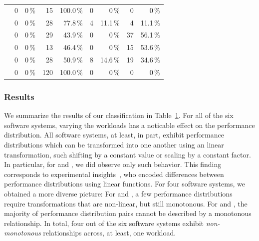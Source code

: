 {\begin{table}
\begin{tabular}{lrrrrrrrr}
	\jumper & 
	0 & 0\,\% & 
	\cellcolor{lt-color!100!white}15 & \cellcolor{lt-color!100!white}100.0\,\% & 
	0 & 0\,\% & 
	0 & 0\,\%\\
	
	\kanzi & 
	0 & 0\,\% & 
	\cellcolor{lt-color!78!white}28 & \cellcolor{lt-color!78!white}77.8\,\% & 
	\cellcolor{xmt-color!11!white}	4& \cellcolor{xmt-color!11!white}11.1\,\% & 
	\cellcolor{nmt-color!11!white}4 & \cellcolor{nmt-color!11!white}11.1\,\%\\
	
	\dconvert & 
	0 & 0\,\% & 
	\cellcolor{lt-color!43!white}29 & \cellcolor{lt-color!43!white}43.9\,\% & 
	0 & 0\,\% & 
	\cellcolor{nmt-color!56!white}37 & \cellcolor{nmt-color!56!white}56.1\,\%\\
	
	\htwo & 
	0& 0\,\% & 
	\cellcolor{lt-color!47!white}13 & \cellcolor{lt-color!47!white}46.4\,\% & 
	0 & 0\,\% & 
	\cellcolor{nmt-color!53!white}15 & \cellcolor{nmt-color!53!white}53.6\,\%\\
	
	\batik & 
	0 & 0\,\% & 
	\cellcolor{lt-color!50!white}28 & \cellcolor{lt-color!50!white}50.9\,\% & 
	\cellcolor{xmt-color!14!white}8 & \cellcolor{xmt-color!14!white}14.6\,\% & 
	\cellcolor{nmt-color!34!white}19 & \cellcolor{nmt-color!34!white}34.6\,\%\\
	
	\jadx & 
	0 & 0\,\% & 
	\cellcolor{lt-color!100!white}120 & \cellcolor{lt-color!100!white}100.0\,\% & 
	0 & 0\,\% & 
	0 & 0\,\%\\
	
	\bottomrule
	\end{tabular}
	\label{tab:categorization_counts}
\end{table}

\subsubsection{Results}
We summarize the results of our classification in Table~\ref{tab:categorization_counts}. For all of the six software systems, varying the workloads has a noticable effect on the performance distribution. All software systems, at least, in part, exhibit performance distributions which can be transformed into one another using an linear  transformation, such shifting by a constant value or scaling by a constant factor. In particular, for \jumper and \jadx, we did  observe only such behavior. This finding corresponds to experimental insights~\citeauthor{jamishidi_transfer_2017}, who encoded differences between performance distributions using linear functions. For four software systems, we obtained a more diverse picture: For \kanzi and \batik, a few performance distributions require transformations that are non-linear, but still monotonous. For \dconvert and \htwo, the majority of performance distribution pairs cannot be described by a monotonous relationship. In total, four out of the six software systems exhibit \emph{non-monotonous} relationships across, at least, one workload.

}
